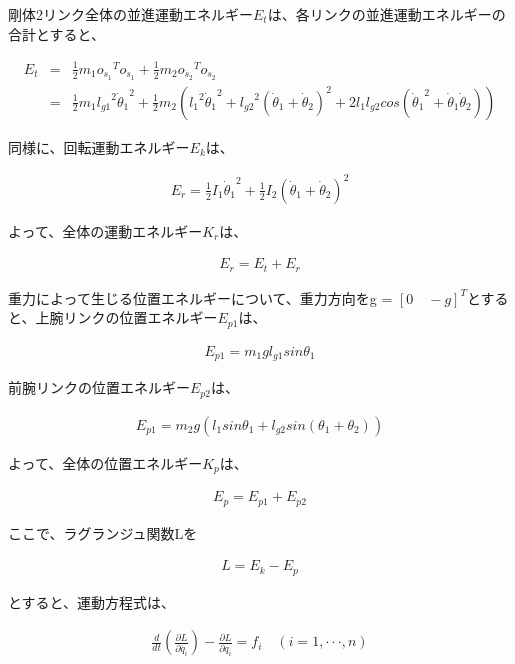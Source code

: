剛体2リンク全体の並進運動エネルギー$E_{t}$は、各リンクの並進運動エネルギーの合計とすると、

\begin{eqnarray}
  E_{t}
  &=&\frac{1}{2}m_{1}o_{\dot{s}_{1}}{}^T\!o_{\dot{s}_{1}} + \frac{1}{2}m_{2}o_{\dot{s}_{2}}{}^T\!o_{\dot{s}_{2}} \nonumber \\
  &=&\frac{1}{2}m_{1}{l_{g1}}^2{\dot{\theta}_{1}}^2 + \frac{1}{2}m_{2}({{l_{1}}^2}{\dot{\theta}_{1}}^2 + {l_{g2}}^2(\dot{\theta}_{1} + \dot{\theta}_{2})^2 + 2{l_{1}}{l_{g2}}cos({\dot{\theta}_{1}}^2 + \dot{\theta}_{1}\dot{\theta}_{2}))
\end{eqnarray}

同様に、回転運動エネルギー$E_{k}$は、

\begin{eqnarray}
  E_{r}
  =\frac{1}{2}I_{1}{\dot{\theta}_{1}}^2 + \frac{1}{2}I_{2}(\dot{\theta}_{1} + \dot{\theta}_{2})^2
\end{eqnarray}

よって、全体の運動エネルギー$K_{r}$は、

\begin{eqnarray}
  E_{r}
  =E_{t} + E_{r}
\end{eqnarray}

重力によって生じる位置エネルギーについて、重力方向をg = ${[0 \quad -g]}^T$とすると、上腕リンクの位置エネルギー$E_{p1}$は、

\begin{eqnarray}
  E_{p1}
  =m_{1}gl_{g1}sin\theta_{1}
\end{eqnarray}

前腕リンクの位置エネルギー$E_{p2}$は、

\begin{eqnarray}
  E_{p1}
  =m_{2}g(l_{1}sin\theta_{1} + l_{g2}sin(\theta_{1} + \theta_{2}))
\end{eqnarray}

よって、全体の位置エネルギー$K_{p}$は、

\begin{eqnarray}
  E_{p}
  =E_{p1} + E_{p2}
\end{eqnarray}

ここで、ラグランジュ関数Lを

\begin{eqnarray}
  L
  =E_{k} - E_{p}
\end{eqnarray}

とすると、運動方程式は、

\begin{eqnarray}
  \frac{d}{dt}(\frac{\partial L}{\partial \dot{q_{i}}}) - \frac{\partial L}{\partial q_{i}} = f_{i} \quad (i = 1,\cdot\cdot\cdot, n)
\end{eqnarray}

